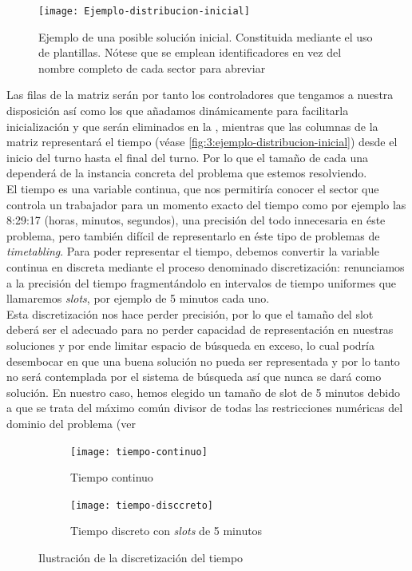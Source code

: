 \begin{figure}
	\centering
	\texttt{[image: Ejemplo-distribucion-inicial]}
	\caption[Ejemplo de una solución inicial]{Ejemplo de una posible solución inicial. Constituida mediante el uso 
		de plantillas. 
		Nótese que se emplean identificadores en vez del nombre completo de cada sector para abreviar}
	\label{fig:3:ejemplo-distribucion-inicial}
\end{figure}

Las filas de la matriz serán por tanto los controladores que tengamos a nuestra disposición así como los que añadamos dinámicamente para facilitarla inicialización y que serán eliminados en la \fasedos{}, mientras que las columnas de la matriz representará el tiempo (véase \autoref{fig:3:ejemplo-distribucion-inicial}) desde el inicio del turno hasta el final del turno. Por lo que el tamaño de cada una dependerá de la instancia concreta del problema que estemos 
resolviendo.
\\

El tiempo es una variable continua, que nos permitiría conocer el sector que controla un trabajador para un momento exacto del tiempo como por ejemplo las 8:29:17 (horas, minutos, segundos), una precisión del todo innecesaria en éste problema, pero también difícil de representarlo en éste tipo de problemas de \textit{timetabling}. Para poder 
representar el tiempo, debemos convertir la variable continua en discreta mediante el proceso denominado 
discretización: renunciamos a la precisión del tiempo fragmentándolo en intervalos de tiempo uniformes que llamaremos \textit{slots}, por ejemplo de 5 minutos cada uno.
\\

Esta discretización nos hace perder precisión, por lo que el tamaño del slot deberá ser el adecuado para no perder capacidad de representación en nuestras soluciones y por ende limitar espacio de búsqueda en exceso, lo cual podría desembocar en que una buena solución no pueda ser representada y por lo tanto no será contemplada por el sistema de búsqueda así que nunca se dará como solución.
En nuestro caso, hemos elegido un tamaño de slot de 5 minutos debido a que se trata del máximo común divisor de todas las restricciones numéricas del dominio del problema (ver %

\begin{figure}[htbp]
	\begin{subfigure}{\linewidth}
		\centering
		\texttt{[image: tiempo-continuo]}
		\caption{Tiempo continuo}
		\label{fig:timepo-continuo}
	\end{subfigure}

	\begin{subfigure}{\linewidth}
		\centering
		\texttt{[image: tiempo-disccreto]}
		\caption{Tiempo discreto con \textit{slots} de 5 minutos}
		\label{fig:timepo-disccreto}
	\end{subfigure}

	\caption{Ilustración de la discretización del tiempo}
\end{figure}

